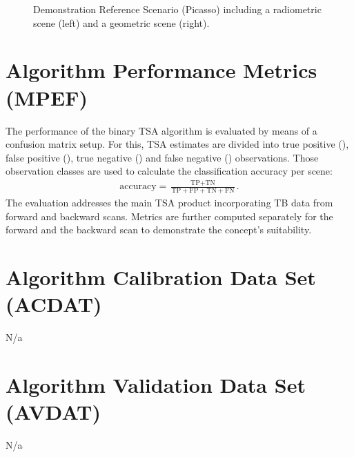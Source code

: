 \documentclass[letterpaper,10pt,english]{jupyterBook}
\let\sphinxpxdimen\pdfpxdimen\else\newdimen\sphinxpxdimen
\begin{document}
\begin{figure}[htbp]
\centering
\capstart

\noindent\sphinxincludegraphics[width=500\sphinxpxdimen]{{picasso-scene}.png}
\caption{Demonstration Reference Scenario (Picasso) including a radiometric scene (left) and a geometric scene (right).}\label{\detokenize{book/algorithm_performance_assessment:picasso-scene}}\end{figure}


\section{Algorithm Performance Metrics (MPEF)}
\label{\detokenize{book/algorithm_performance_assessment:algorithm-performance-metrics-mpef}}
\sphinxAtStartPar
The performance of the binary TSA algorithm is evaluated by means of a confusion matrix set\sphinxhyphen{}up.
For this, TSA estimates are divided into true positive ({\hyperref[\detokenize{book/acronyms:term-TP}]{}}), false positive ({\hyperref[\detokenize{book/acronyms:term-FP}]{}}), true negative ({\hyperref[\detokenize{book/acronyms:term-TN}]{}}) and false negative ({\hyperref[\detokenize{book/acronyms:term-FN}]{}}) observations.
Those observation classes are used to calculate the classification accuracy per scene:
\begin{equation}\label{equation:book/algorithm_performance_assessment:accuracy}
\begin{split}\text{accuracy} = \frac{\text{TP}+\text{TN}}{\text{TP}+\text{FP}+\text{TN}+\text{FN}}.\end{split}
\end{equation}
\sphinxAtStartPar
The evaluation addresses the main TSA product incorporating TB data from forward and backward scans.
Metrics are further computed separately for the forward and the backward scan to demonstrate the concept’s suitability.


\section{Algorithm Calibration Data Set (ACDAT)}
\label{\detokenize{book/algorithm_performance_assessment:algorithm-calibration-data-set-acdat}}
\sphinxAtStartPar
N/a


\section{Algorithm Validation Data Set (AVDAT)}
\label{\detokenize{book/algorithm_performance_assessment:algorithm-validation-data-set-avdat}}
\sphinxAtStartPar
N/a
\end{document}

